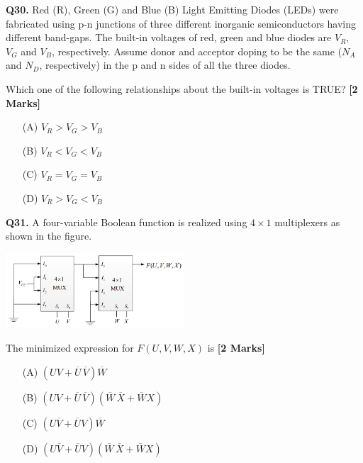 \documentclass[11pt]{article}
\newcommand{\questionb}[2]{
    \noindent\textbf{Q#2.} #1 \hfill \textbf{[2 Marks]}
}
\begin{document}
\vspace{0.5cm}

\questionb{Red (R), Green (G) and Blue (B) Light Emitting Diodes (LEDs) were fabricated using p-n junctions of three different inorganic semiconductors having different band-gaps. The built-in voltages of red, green and blue diodes are $V_R$, $V_G$ and $V_B$, respectively. Assume donor and acceptor doping to be the same ($N_A$ and $N_D$, respectively) in the p and n sides of all the three diodes.

Which one of the following relationships about the built-in voltages is TRUE?}{30}
\begin{enumerate}
    \item[(A)] $V_R > V_G > V_B$
    \item[(B)] $V_R < V_G < V_B$
    \item[(C)] $V_R = V_G = V_B$
    \item[(D)] $V_R > V_G < V_B$
\end{enumerate}

\vspace{0.5cm}

\questionb{A four-variable Boolean function is realized using $4 \times 1$ multiplexers as shown in the figure.

\begin{center}
\includegraphics[width=0.5\textwidth]{figures/31.png}
\end{center}

The minimized expression for $F(U,V,W,X)$ is}{31}
\begin{enumerate}
    \item[(A)] $(UV + \overline{U}\,\overline{V})\overline{W}$
    \item[(B)] $(UV + \overline{U}\,\overline{V})(\overline{W}\,\overline{X} + \overline{W}X)$
    \item[(C)] $(U\overline{V} + \overline{U}V)\overline{W}$
    \item[(D)] $(U\overline{V} + \overline{U}V)(\overline{W}\,\overline{X} + \overline{W}X)$
\end{enumerate}

\vspace{0.5cm}
\end{document}
